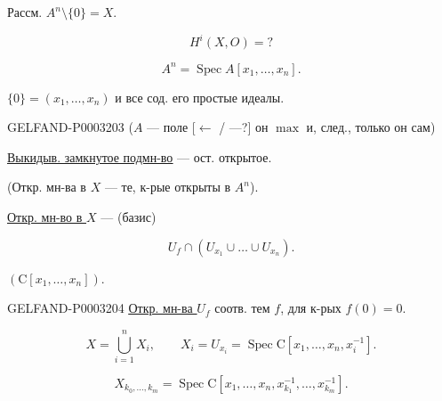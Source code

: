 Рассм. $A^n\setminus\{0\}=X$.

\begin{equation*}H^i(X,O)=?\end{equation*}

\begin{equation*}A^n=\operatorname{Spec} A[x_1,\ldots,x_n].\end{equation*}

$\{0\}=(x_1,\ldots,x_n)$ и все сод. его простые идеалы.

\begin{GelfandAdjacentEvidence}{GELFAND-P000320}{3}
($A$ --- поле [$\leftarrow$ / ---?] он $\max$ и, след., только он сам)

\end{GelfandAdjacentEvidence}


\uline{\uline{Выкидыв. замкнутое подмн-во}} --- ост. открытое.


(Откр. мн-ва в $X$ --- те, к-рые открыты в $A^n$).

\uline{Откр. мн-во в $X$} --- (базис)

\begin{equation*}U_f\cap(U_{x_1}\cup\ldots\cup U_{x_n}).\end{equation*}

$(\mathrm C[x_1,\ldots,x_n])$.

\begin{GelfandAdjacentEvidence}{GELFAND-P000320}{4}
\uline{\uline{Откр. мн-ва $U_f$}} соотв. тем $f$, для к-рых \uline{\uline{$f(0)=0$}}.

\end{GelfandAdjacentEvidence}


\begin{equation*}X=\bigcup_{i=1}^n X_i,\qquad X_i=U_{x_i}=\operatorname{Spec}\mathrm C[x_1,\ldots,x_n,x_i^{-1}].\end{equation*}

\begin{equation*}X_{k_0,\ldots,k_m}=\operatorname{Spec}\mathrm C[x_1,\ldots,x_n,x_{k_1}^{-1},\ldots,x_{k_m}^{-1}].\end{equation*}






